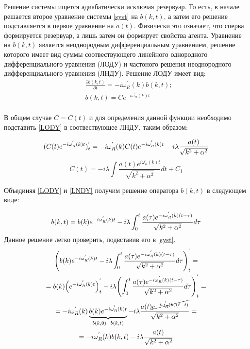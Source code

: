 Решение системы ищется адиабатически исключая резервуар.
То есть, в начале решается второе уравнение системы \eqref{syst} на ${b}(k,t) $, а затем его решение
подставляется в первое уравнение на $\dot{a}(t)$.
Физически это означает, что сперва формируется резервуар, а лишь затем он формирует свойства агента.
Уравнение на ${b}(k,t)$ является неоднородным дифференциальным уравнением, решение которого имеет
вид суммы соотвествующего линейного однородного дифференциального уравнения (ЛОДУ) и частоного решения
неоднородного дифференциального уравнения (ЛНДУ).
Решение ЛОДУ имеет вид:
\begin{equation}\label{LODY}
\begin{split}
    & \frac{\partial b(k,t)}{\partial t} = -i \omega^{'}_{R}(k) b(k,t); \\
    & b(k,t) = Ce^{-i \omega^{'}_{R}(k) t} \\
\end{split}
\end{equation}

В общем случае $C = C(t)$ и для определения данной функции необходимо подставить \eqref{LODY} в
соотвествующее ЛНДУ, таким образом:

\begin{equation}\notag
    (C(t)e^{-i \omega^{'}_{R}(k) t})^{'}_{t} = -i \omega^{'}_{R}(k) C(t)e^{-i \omega^{'}_{R}(k) t} -i \lambda \frac{a(t)}{\sqrt{k^{2} + \alpha^{2}}}
\end{equation}
\begin{equation}\label{LNDY}
    C(t) = -i \lambda \int \frac{a(t)e^{i \omega^{'}_{R}(k) t}}{\sqrt{k^{2} + \alpha^{2}}} dt + C_{1}
\end{equation}

Объединяя \eqref{LODY} и \eqref{LNDY} получим решение оператора ${b}(k,t)$ в следующем виде:

\begin{equation}\notag
b(k,t) = b(k)e^{-i \omega^{'}_{R}(k) t} -i \lambda \int_{0}^{t} \frac{a(\tau)e^{-i \omega^{'}_{R}(k) (t-\tau)}}{\sqrt{k^{2} + \alpha^{2}}} d\tau \\
\end{equation}
Данное решение легко проверить, подвставив его в \eqref{syst}.
\begin{multline}\notag
\Biggl( b(k)e^{-i \omega^{'}_{R}(k) t} -i \lambda \int_{0}^{t} \frac{a(\tau)e^{-i \omega^{'}_{R}(k) (t-\tau)}}{\sqrt{k^{2} + \alpha^{2}}} d\tau \Biggr)^{'}_{t} =  \\
= b(k) \Bigl( e^{-i \omega^{'}_{R}(k) t} \Bigr)^{'}_{t} - i \lambda \Biggl( \int_{0}^{t} \frac{a(\tau)e^{-i \omega^{'}_{R}(k) (t-\tau)}}{\sqrt{k^{2} + \alpha^{2}}} d\tau \Biggr)^{'}_{t} = \\
= -i \omega^{'}_{R}(k) \underbrace{b(k)e^{-i \omega^{'}_{R}(k) t}}_{b(k,0) = b(k,t)} -i \lambda \frac{a(t) \cancel{e^{-i \omega^{'}_{R}(k) (t-t)}}}{\sqrt{k^{2} + \alpha^{2}}} = \\
= -i \omega^{'}_{R}(k) b(k,t) -i \lambda \frac{a(t)}{\sqrt{k^{2} + \alpha^{2}}}
\end{multline}


